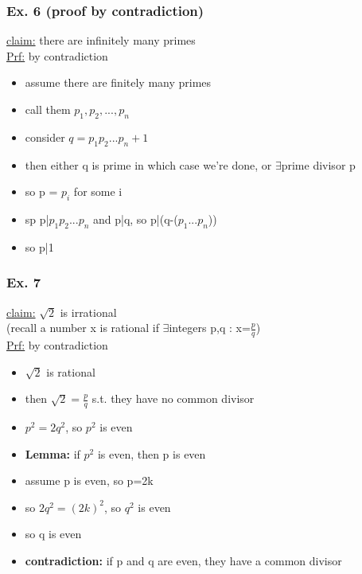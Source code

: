 \documentclass[a4paper]{article}
\newcommand{\te}{$\exists$}
\begin{document}
\begin{itemize}
      \subsubsection{Ex. 6 (proof by contradiction)}
        \underline{claim:} there are infinitely many primes\\
        \underline{Prf:} by contradiction
        \begin{itemize}
          \item assume there are finitely many primes
          \item call them $p_{1},p_2,...,p_{n}$
          \item consider $q=p_{1}p_2...p_{n}+1$
          \item then either q is prime in which case we're done, or \te prime
          divisor p
          \item so p = $p_{i}$ for some i
          \item sp p|$p_{1}p_2...p_{n}$ and p|q, so p|(q-($p_{1}...p_{n}$))
          \item so p|1
        \end{itemize}
      \subsubsection{Ex. 7}
        \underline{claim:} $\sqrt{2}$ is irrational\\
        (recall a number x is rational if \te integers p,q : x=$\frac{p}{q}$)\\
        \underline{Prf:} by contradiction
        \begin{itemize}
          \item $\sqrt{2}$ is rational
          \item then $\sqrt{2}= \frac{p}{q}$ s.t. they have no common divisor
          \item $p^2=2q^2$, so $p^2$ is even
          \item \textbf{Lemma:} if $p^2$ is even, then p is even
          \item assume p is even, so p=2k
          \item so $2q^2 = (2k)^2$, so $q^2$ is even
          \item so q is even
          \item \textbf{contradiction:} if p and q are even, they have a common
          divisor
        \end{itemize}

\end{itemize}
\end{document}
